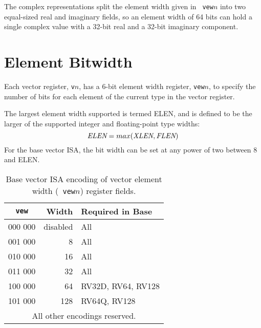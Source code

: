 \begin{commentary}
  The complex representations split the element width given in {\tt
    vew}$n$ into two equal-sized real and imaginary fields, so an
  element width of 64 bits can hold a single complex value with a
  32-bit real and a 32-bit imaginary component.
\end{commentary}

\clearpage

\section{Element Bitwidth}

Each vector register, {\tt v}$n$, has a 6-bit element width
register, {\tt vew}$n$, to specify the number of bits for each element
of the current type in the vector register.

The largest element width supported is
termed ELEN, and is defined to be the larger of the supported integer
and floating-point type widths:
\[ \mbox{\em ELEN} = max(\mbox{\em XLEN}, \mbox{\em FLEN}) \]
For the base vector ISA, the bit width can be set at any power of two
between 8 and ELEN.

\begin{table}[hbt]
  \centering
  \begin{tabular}{|c|r|l|}
    \hline
        {\tt vew} & Width & Required in Base \\
        \hline
        000 000 & disabled & All \\
        001 000 & 8 & All \\
        010 000 & 16 & All \\
        011 000 & 32 & All \\
        100 000 & 64 & RV32D, RV64, RV128\\
        101 000 & 128 & RV64Q, RV128\\
        \hline
        \multicolumn{3}{|c|}{All other encodings reserved.}\\
        \hline
  \end{tabular}
  \caption{Base vector ISA encoding of vector element width ({\tt
      vew}$n$) register fields.}
  \label{tab:basevew}
\end{table}

